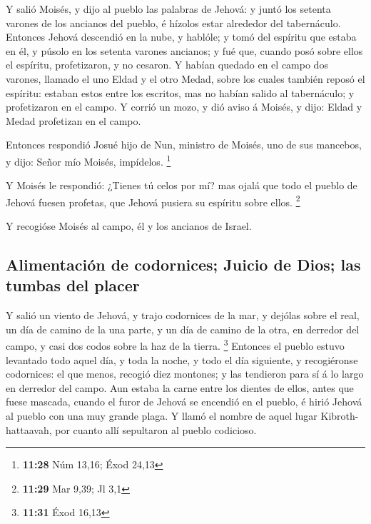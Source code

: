  Y salió Moisés, y dijo al pueblo las palabras de Jehová:
y juntó los setenta varones de los ancianos del pueblo, é hízolos estar
alrededor del tabernáculo.  Entonces Jehová descendió en
la nube, y hablóle; y tomó del espíritu que estaba en él, y púsolo en
los setenta varones ancianos; y fué que, cuando posó sobre ellos el
espíritu, profetizaron, y no cesaron.  Y habían quedado
en el campo dos varones, llamado el uno Eldad y el otro Medad, sobre los
cuales también reposó el espíritu: estaban estos entre los escritos, mas
no habían salido al tabernáculo; y profetizaron en el campo.
 Y corrió un mozo, y dió aviso á Moisés, y dijo: Eldad y
Medad profetizan en el campo.

 Entonces respondió Josué hijo de Nun, ministro de
Moisés, uno de sus mancebos, y dijo: Señor mío Moisés, impídelos.
\footnote{\textbf{11:28} Núm 13,16; Éxod 24,13}

 Y Moisés le respondió: ¿Tienes tú celos por mí? mas
ojalá que todo el pueblo de Jehová fuesen profetas, que Jehová pusiera
su espíritu sobre ellos. \footnote{\textbf{11:29} Mar 9,39; Jl 3,1}

 Y recogióse Moisés al campo, él y los ancianos de
Israel.

\hypertarget{alimentaciuxf3n-de-codornices-juicio-de-dios-las-tumbas-del-placer}{%
\subsection{Alimentación de codornices; Juicio de Dios; las tumbas del
placer}\label{alimentaciuxf3n-de-codornices-juicio-de-dios-las-tumbas-del-placer}}

 Y salió un viento de Jehová, y trajo codornices de la
mar, y dejólas sobre el real, un día de camino de la una parte, y un día
de camino de la otra, en derredor del campo, y casi dos codos sobre la
haz de la tierra. \footnote{\textbf{11:31} Éxod 16,13} 
Entonces el pueblo estuvo levantado todo aquel día, y toda la noche, y
todo el día siguiente, y recogiéronse codornices: el que menos, recogió
diez montones; y las tendieron para sí á lo largo en derredor del campo.
 Aun estaba la carne entre los dientes de ellos, antes
que fuese mascada, cuando el furor de Jehová se encendió en el pueblo, é
hirió Jehová al pueblo con una muy grande plaga.  Y llamó
el nombre de aquel lugar Kibroth-hattaavah, por cuanto allí sepultaron
al pueblo codicioso.

